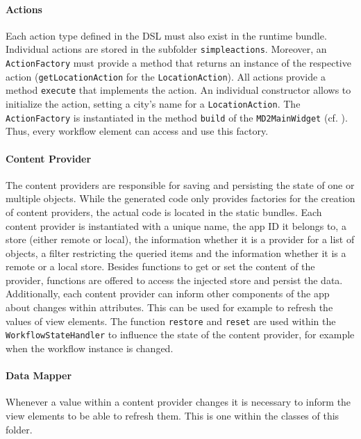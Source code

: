 \paragraph{Actions}
Each action type defined in the \MD DSL must also exist in the \MD runtime bundle. Individual actions are stored in the subfolder \lstinline!simpleactions!. Moreover, an \lstinline!ActionFactory! must provide a method that returns an instance of the respective action (\eg \lstinline!getLocationAction! for the \lstinline!LocationAction!). All actions provide a method \lstinline!execute! that implements the action. An individual constructor allows to initialize the action, \eg setting a city's name for a \lstinline!LocationAction!. The \lstinline!Action!\lstinline!Factory! is instantiated in the method \lstinline!build! of the \lstinline!MD2MainWidget! (cf. ). Thus, every workflow element can access and use this factory.

\paragraph{Content Provider}\label{par:contentProvider}
The content providers are responsible for saving and persisting the state of one or multiple objects. While the generated code only provides factories for the creation of content providers, the actual code is located in the static bundles. Each content provider is instantiated with a unique name, the app ID it belongs to, a store (either remote or local), the information whether it is a provider for a list of objects, a filter restricting the queried items and the information whether it is a remote or a local store.
Besides functions to get or set the content of the provider, functions are offered to access the injected store and persist the data.
Additionally, each content provider can inform other components of the app about changes within attributes. This can be used for example to refresh the values of view elements.
The function \lstinline|restore| and \lstinline|reset| are used within the \lstinline|WorkflowStateHandler| to  influence the state of the content provider, for example when the workflow instance is changed.

\paragraph{Data Mapper}
Whenever a value within a content provider changes it is necessary to inform the view elements to be able to refresh them. This is one within the classes of this folder.

